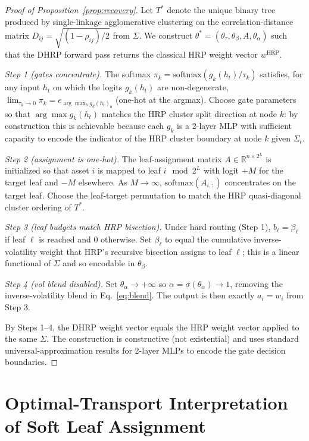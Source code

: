 \begin{proof}[Proof of Proposition~\ref{prop:recovery}]
Let $T^*$ denote the unique binary tree produced by single-linkage
agglomerative clustering on the correlation-distance matrix
$D_{ij} = \sqrt{(1-\rho_{ij})/2}$ from $\Sigma$. We construct
$\theta^* = (\theta_\tau, \theta_\beta, A, \theta_\alpha)$ such that the
DHRP forward pass returns the classical HRP weight vector $w^{\text{HRP}}$.

\emph{Step 1 (gates concentrate).} The softmax
$\pi_k = \mathrm{softmax}(g_k(h_t)/\tau_k)$ satisfies, for any input
$h_t$ on which the logits $g_k(h_t)$ are non-degenerate,
$\lim_{\tau_k \to 0} \pi_k = e_{\arg\max_b g_k(h_t)_b}$ (one-hot at
the argmax). Choose gate parameters so that $\arg\max g_k(h_t)$ matches
the HRP cluster split direction at node $k$: by construction this is
achievable because each $g_k$ is a 2-layer MLP with sufficient capacity
to encode the indicator of the HRP cluster boundary at node $k$ given
$\Sigma_t$.

\emph{Step 2 (assignment is one-hot).} The leaf-assignment matrix
$A \in \mathbb{R}^{n \times 2^L}$ is initialized so that asset $i$ is
mapped to leaf $i \mod 2^L$ with logit $+M$ for the target leaf and
$-M$ elsewhere. As $M \to \infty$, $\mathrm{softmax}(A_{i,:})$
concentrates on the target leaf. Choose the leaf-target permutation
to match the HRP quasi-diagonal cluster ordering of $T^*$.

\emph{Step 3 (leaf budgets match HRP bisection).} Under hard routing
(Step 1), $b_\ell = \beta_\ell$ if leaf $\ell$ is reached and $0$
otherwise. Set $\beta_\ell$ to equal the cumulative inverse-volatility
weight that HRP's recursive bisection assigns to leaf $\ell$; this is a
linear functional of $\Sigma$ and so encodable in $\theta_\beta$.

\emph{Step 4 (vol blend disabled).} Set $\theta_\alpha \to +\infty$ so
$\alpha = \sigma(\theta_\alpha) \to 1$, removing the inverse-volatility
blend in Eq.~\ref{eq:blend}. The output is then exactly $a_i = w_i$
from Step 3.

By Steps 1--4, the DHRP weight vector equals the HRP weight vector
applied to the same $\Sigma$. The construction is constructive (not
existential) and uses standard universal-approximation results for
2-layer MLPs to encode the gate decision boundaries.
\end{proof}

\section{Optimal-Transport Interpretation of Soft Leaf Assignment}
\label{app:ot}

